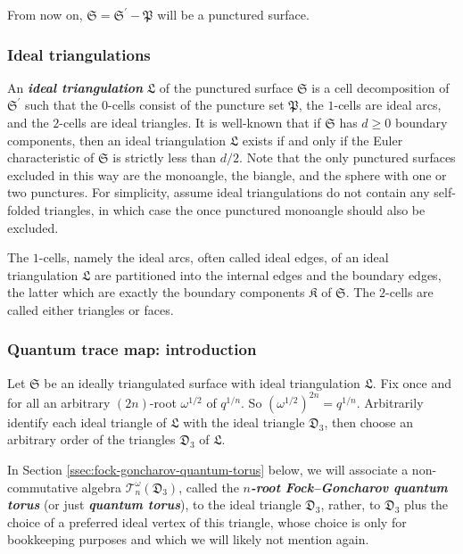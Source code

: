 \documentclass[12pt,
	]{amsart}
\theoremstyle{definition}
\newcommand{\mcal}[1]{\mathcal{#1}}
\newcommand{\mfrak}[1]{\mathfrak{#1}}
\newcommand{\define}[1]{{\textit{\textbf{#1}}}}
\newcommand{\surf}{\mfrak{S}}
\newcommand{\qroot}{q^{1/n}}
\newcommand{\punc}{\mfrak{P}}
\newcommand{\ttriang}{\mfrak{D}_3}
\newcommand{\idealtriang}{\mfrak{L}}
\newcommand{\comp}{\mfrak{K}}
\newcommand{\wroot}{\omega}
\newcommand{\qtorus}[1]{\mcal{T}_n^\wroot(#1)}
\begin{document}
From now on, $\surf=\surf^\prime-\punc$ will be a punctured surface.  

\subsubsection{Ideal triangulations}\label{sssec:good-position-of-a-web-with-respect-to-a-split-ideal-triangulation}

An \define{ideal triangulation} $\idealtriang$ of the punctured surface $\surf$ is a cell decomposition of $\surf^\prime$ such that the $0$-cells consist of the puncture set $\punc$, the $1$-cells are ideal arcs, and the $2$-cells are ideal triangles. It is well-known \cite{bonahonMR2851072} that if $\surf$ has $d\geq0$ boundary components, then an ideal triangulation $\idealtriang$ exists if and only if the Euler characteristic of $\surf$ is strictly less than $d/2$. Note that the only punctured surfaces excluded in this way are the monoangle, the biangle, and the sphere with one or two punctures.  For simplicity, assume ideal triangulations do not contain any self-folded triangles, in which case the once punctured monoangle should also be excluded.  

The $1$-cells, namely the ideal arcs, often called ideal edges, of an ideal triangulation $\idealtriang$ are partitioned into the internal edges and the boundary edges, the latter which are exactly the boundary components $\comp$ of $\surf$.  The $2$-cells are called either triangles or faces.  

\subsubsection{Quantum trace map:  introduction}\label{sssec:quantum-trace-map}

Let $\surf$ be an ideally triangulated surface with ideal triangulation $\idealtriang$.  Fix once and for all an arbitrary $(2n)$-root $\wroot^{1/2}$ of $\qroot$.  So $(\wroot^{1/2})^{2n}=\qroot$. Arbitrarily identify each ideal triangle of $\idealtriang$ with the ideal triangle $\ttriang$, then choose an arbitrary order of the triangles $\ttriang$ of $\idealtriang$.  

In Section \ref{ssec:fock-goncharov-quantum-torus} below, we will associate a non-commutative algebra $\qtorus{\ttriang}$, called the \define{$n$-root Fock--Goncharov quantum torus} (or just \define{quantum torus}), to the ideal triangle $\ttriang$, rather, to $\ttriang$ plus the choice of a preferred ideal vertex of this triangle, whose choice is only for bookkeeping purposes and which we will likely not mention again.  
\end{document}

